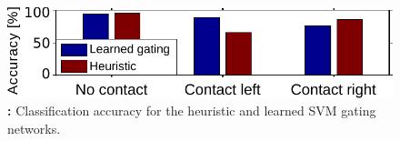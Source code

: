 


	\begin{figure}[t]
			\centering
			\includegraphics[width=.94\hsize]{fig/exp5_accuracy_red}
		\caption{\textbf{:} Classification accuracy for the heuristic and learned SVM gating networks.
		}
		\label{fig:exp5:accuracy}
        \figspace
	\end{figure}
